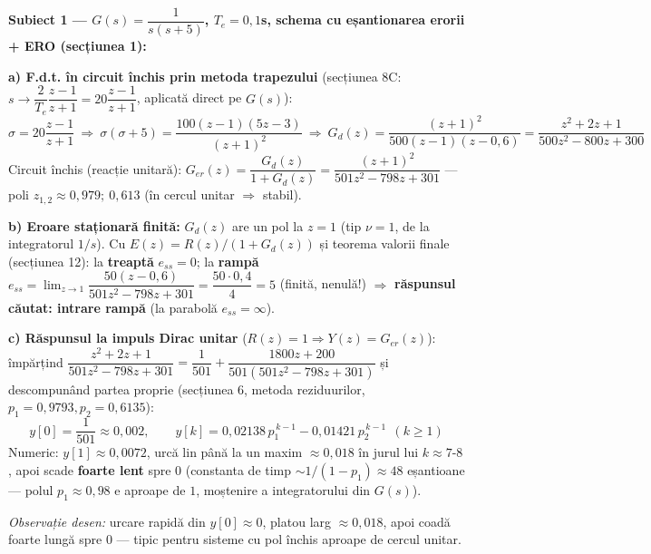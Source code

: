 \documentclass[10pt,a4paper]{article}
\begin{document}
\begin{keyeq}\color{red!65!black}
\textbf{Subiect 1 — $G(s)=\dfrac1{s(s+5)}$, $T_e{=}0{,}1$s, schema cu eșantionarea erorii + ERO (secțiunea 1):}

\textbf{a) F.d.t. în circuit închis prin metoda trapezului} (secțiunea 8C: $s\to\dfrac2{T_e}\dfrac{z-1}{z+1}=20\dfrac{z-1}{z+1}$, aplicată direct pe $G(s)$):
$$\sigma=20\dfrac{z-1}{z+1}\ \Rightarrow\ \sigma(\sigma{+}5)=\dfrac{100(z-1)(5z-3)}{(z+1)^2}\ \Rightarrow\ G_d(z)=\dfrac{(z+1)^2}{500(z-1)(z-0{,}6)}=\dfrac{z^2+2z+1}{500z^2-800z+300}$$
Circuit închis (reacție unitară): $G_{er}(z)=\dfrac{G_d(z)}{1+G_d(z)}=\dfrac{(z+1)^2}{501z^2-798z+301}$ — poli $z_{1,2}\approx0{,}979;\ 0{,}613$ (în cercul unitar $\Rightarrow$ stabil).

\textbf{b) Eroare staționară finită:} $G_d(z)$ are un pol la $z{=}1$ (tip $\nu{=}1$, de la integratorul $1/s$). Cu $E(z){=}R(z)/(1{+}G_d(z))$ și teorema valorii finale (secțiunea 12): la \textbf{treaptă} $e_{ss}{=}0$; la \textbf{rampă} $e_{ss}{=}\lim_{z\to1}\dfrac{50(z-0{,}6)}{501z^2-798z+301}=\dfrac{50\cdot0{,}4}{4}=5$ (finită, nenulă!) $\Rightarrow$ \textbf{răspunsul căutat: intrare rampă} (la parabolă $e_{ss}{=}\infty$).

\textbf{c) Răspunsul la impuls Dirac unitar} ($R(z){=}1\Rightarrow Y(z){=}G_{er}(z)$): împărțind $\dfrac{z^2+2z+1}{501z^2-798z+301}=\dfrac1{501}+\dfrac{1800z+200}{501(501z^2-798z+301)}$ și descompunând partea proprie (secțiunea 6, metoda reziduurilor, $p_1{=}0{,}9793,p_2{=}0{,}6135$):
$$y[0]=\dfrac1{501}\approx0{,}002,\qquad y[k]=0{,}02138\,p_1^{\,k-1}-0{,}01421\,p_2^{\,k-1}\ \ (k\ge1)$$
Numeric: $y[1]{\approx}0{,}0072$, urcă lin până la un maxim ${\approx}0{,}018$ în jurul lui $k{\approx}7$-$8$, apoi scade \textbf{foarte lent} spre $0$ (constanta de timp $\sim1/(1{-}p_1){\approx}48$ eșantioane — polul $p_1{\approx}0{,}98$ e aproape de $1$, moștenire a integratorului din $G(s)$).
\end{keyeq}

\begin{center}
\end{center}
\textit{Observație desen:} urcare rapidă din $y[0]{\approx}0$, platou larg $\approx0{,}018$, apoi coadă foarte lungă spre $0$ — tipic pentru sisteme cu pol închis aproape de cercul unitar.
\end{document}
